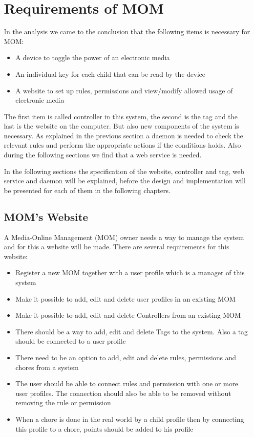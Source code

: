\section{Requirements of MOM}
\label{sec:RequirMOM}

In the analysis we came to the conclusion that the following items is necessary for MOM: 
\begin{itemize}
	\item A device to toggle the power of an electronic media
	\item An individual key for each child that can be read by the device
	\item A website to set up rules, permissions and view/modify allowed usage of electronic media
\end{itemize} 


The first item is called controller in this system, the second is the tag and the last is the website on the computer. But also new components of the system is necessary. As explained in the previous section a daemon is needed to check the relevant rules and perform the appropriate actions if the conditions holds. Also during the following sections we find that a web service is needed. 

In the following sections the specification of the website, controller and tag, web service and daemon will be explained, before the design and implementation will be presented for each of them in the following chapters.  

\subsection{MOM's Website}
A Media-Online Management (MOM) owner needs a way to manage the system and for this a website will be made. There are several requirements for this website:

\begin{itemize}
	\item Register a new MOM together with a user profile which is a manager of this system
	\item Make it possible to add, edit and delete user profiles in an existing MOM 
	\item Make it possible to add, edit and delete Controllers from an existing MOM
	\item There should be a way to add, edit and delete Tags to the system. Also a tag should be connected to a user profile
	\item There need to be an option to add, edit and delete rules, permissions and chores from a system
	\item The user should be able to connect rules and permission with one or more user profiles. The connection should also be able to be removed without removing the rule or permission
	\item When a chore is done in the real world by a child profile then by connecting this profile to a chore, points should be added to his profile
\end{itemize}

